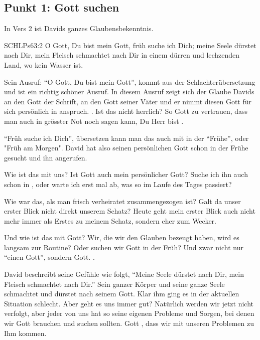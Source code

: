 \documentclass[14pt]{mybib}
\begin{document}
    \subsection*{Punkt 1: Gott suchen}
    \begin{otsblock}
    In Vers 2 ist Davids ganzes Glaubensbekenntnis. 
    \begin{bibelbox}{SCHL}{Ps}{63:2}
        O Gott, Du bist mein Gott, früh suche ich Dich; meine Seele dürstet nach Dir, mein Fleisch schmachtet nach Dir in einem dürren und lechzenden Land, wo kein Wasser ist.
    \end{bibelbox}
    Sein Ausruf: \enquote{O Gott, Du bist mein Gott}, kommt aus der Schlachterübersetzung und ist ein richtig schöner Ausruf. In diesem Ausruf zeigt sich der Glaube Davids an den Gott der Schrift, an den Gott seiner Väter und er nimmt diesen Gott für sich persönlich in anspruch. . Ist das nicht herrlich? So  Gott zu vertrauen, dass man auch in grösster Not noch sagen kann, Du Herr bist . 

    \enquote{Früh suche ich Dich}, übersetzen kann man das auch mit in der \enquote{Frühe}, oder "Früh am Morgen". David hat also seinen persönlichen Gott schon in der Frühe gesucht und ihn angerufen.
    \end{otsblock}    

    \begin{otsblock}
        Wie ist das mit uns? Ist Gott auch mein persönlicher Gott? Suche ich ihn auch schon in , oder warte ich erst mal ab, was so im Laufe des Tages passiert?

        Wie war das, als man frisch verheiratet zusammengezogen ist? Galt da unser erster Blick nicht direkt unserem Schatz? Heute geht mein erster Blick auch nicht mehr immer als Erstes zu meinem Schatz, sondern eher zum Wecker.

        Und wie ist das mit  Gott? Wir, die wir den Glauben bezeugt haben, wird es langsam zur Routine? Oder suchen wir Gott in der Früh? Und zwar nicht nur \enquote{einen Gott}, sondern  Gott. .

        David beschreibt seine Gefühle wie folgt, \enquote{Meine Seele dürstet nach Dir, mein Fleisch schmachtet nach Dir.} Sein ganzer Körper und seine ganze Seele schmachtet und dürstet nach seinem Gott. Klar ihm ging es in der aktuellen Situation schlecht. Aber geht es uns immer gut? Natürlich werden wir jetzt nicht verfolgt, aber jeder von uns hat so seine eigenen Probleme und Sorgen, bei denen wir Gott brauchen und suchen sollten. Gott , dass wir mit unseren Problemen zu Ihm kommen.
    \end{otsblock}
\end{document}
